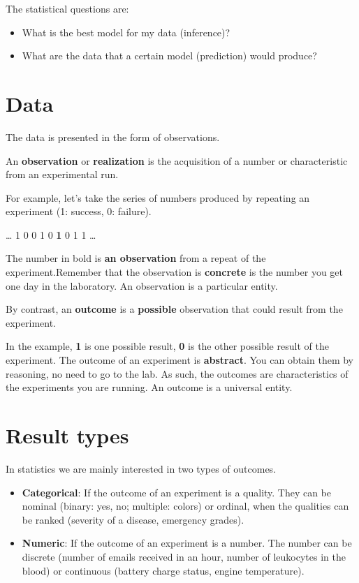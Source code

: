 \documentclass[
]{book}
\providecommand{\tightlist}{%
  \setlength{\itemsep}{0pt}\setlength{\parskip}{0pt}}
\begin{document}
The statistical questions are:

\begin{itemize}
\tightlist
\item
  What is the best model for my data (inference)?
\item
  What are the data that a certain model (prediction) would produce?
\end{itemize}

\hypertarget{data}{%
\section{Data}\label{data}}

The data is presented in the form of observations.

An \textbf{observation} or \textbf{realization} is the acquisition of a number or characteristic from an experimental run.

For example, let's take the series of numbers produced by repeating an experiment (1: success, 0: failure).

\ldots{} 1 0 0 1 0 \textbf{1} 0 1 1 \ldots{}

The number in bold is \textbf{an observation} from a repeat of the experiment.Remember that the observation is \textbf{concrete} is the number you get one day in the laboratory. An observation is a particular entity.

By contrast, an \textbf{outcome} is a \textbf{possible} observation that could result from the experiment.

In the example, \textbf{1} is one possible result, \textbf{0} is the other possible result of the experiment. The outcome of an experiment is \textbf{abstract}. You can obtain them by reasoning, no need to go to the lab. As such, the outcomes are characteristics of the experiments you are running. An outcome is a universal entity.

\hypertarget{result-types}{%
\section{Result types}\label{result-types}}

In statistics we are mainly interested in two types of outcomes.

\begin{itemize}
\item
  \textbf{Categorical}: If the outcome of an experiment is a quality. They can be nominal (binary: yes, no; multiple: colors) or ordinal, when the qualities can be ranked (severity of a disease, emergency grades).
\item
  \textbf{Numeric}: If the outcome of an experiment is a number. The number can be discrete (number of emails received in an hour, number of leukocytes in the blood) or continuous (battery charge status, engine temperature).
\end{itemize}
\end{document}
